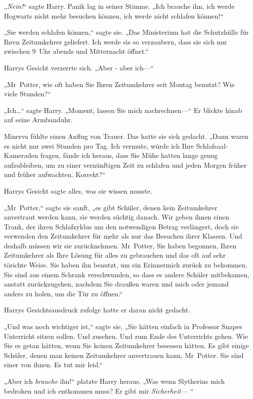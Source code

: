 {„\emph{Nein!}“ sagte Harry. Panik lag in seiner Stimme. „Ich brauche ihn, ich werde Hogwarts nicht mehr besuchen können, ich werde nicht schlafen können!“

„Sie werden schlafen können,“ sagte sie. „Das Ministerium hat die Schutzhülle für Ihren Zeitumkehrer geliefert. Ich werde sie so verzaubern, dass sie sich nur zwischen 9~Uhr abends und Mitternacht öffnet.“

Harrys Gesicht verzerrte sich. „Aber - aber ich—“

„Mr~Potter, wie oft haben Sie Ihren Zeitumkehrer seit Montag benutzt? Wie viele Stunden?“

„Ich…“ sagte Harry. „Moment, lassen Sie mich nachrechnen—“ Er blickte hinab auf seine Armbanduhr.

Minerva fühlte einen Anflug von Trauer. Das hatte sie sich gedacht. „Dann waren es nicht nur zwei Stunden pro Tag. Ich vermute, würde ich Ihre Schlafsaal-Kameraden fragen, fände ich heraus, dass Sie Mühe hatten lange genug aufzubleiben, um zu einer vernünftigen Zeit zu schlafen und jeden Morgen früher und früher aufwachten. Korrekt?“

Harrys Gesicht sagte alles, was sie wissen musste.

„Mr~Potter,“ sagte sie sanft, „es gibt Schüler, denen kein Zeitumkehrer anvertraut werden kann, sie werden süchtig danach. Wir geben ihnen einen Trank, der ihren Schlafzyklus um den notwendigen Betrag verlängert, doch sie verwenden den Zeitumkehrer für mehr als nur das Besuchen ihrer Klassen. Und deshalb müssen wir sie zurücknehmen. Mr~Potter, Sie haben begonnen, Ihren Zeitumkehrer als Ihre Lösung für alles zu gebrauchen und das oft auf sehr törichte Weise. Sie haben ihn benutzt, um ein Erinnermich zurück zu bekommen. Sie sind aus einem Schrank verschwunden, so dass es andere Schüler mitbekamen, anstatt zurückzugehen, nachdem Sie draußen waren und mich oder jemand anders zu holen, um die Tür zu öffnen.“

Harrys Gesichtsausdruck zufolge hatte er daran nicht gedacht.

„Und was noch wichtiger ist,“ sagte sie, „Sie hätten einfach in Professor Snapes Unterricht sitzen sollen. Und zusehen. Und zum Ende des Unterrichts gehen. Wie Sie es getan hätten, wenn Sie keinen Zeitumkehrer besessen hätten. Es gibt einige Schüler, denen man keinen Zeitumkehrer anvertrauen kann, Mr~Potter. Sie sind einer von ihnen. Es tut mir leid.“

„Aber ich \emph{brauche} ihn!“ platzte Harry heraus. „Was wenn Slytherins mich bedrohen und ich entkommen muss? Er gibt mir \emph{Sicherheit—} “

}
